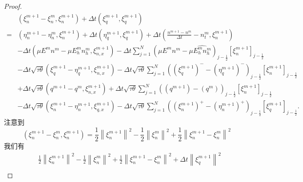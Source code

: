\begin{proof}
    $$
        \begin{aligned}
              & \left(\xi_{n}^{m+1}-\xi_{n}^{m}, \xi_{n}^{m+1}\right)+\Delta t\left(\xi_{q}^{m+1}, \xi_{q}^{m+1}\right)                                                                                                                                                                   \\
            = & \left(\eta_{n}^{m+1}-\eta_{n}^{m}, \xi_{n}^{m+1}\right)+\Delta t\left(\eta_{q}^{m+1}, \xi_{q}^{m+1}\right)+\Delta t\left(\frac{n^{m+1}-n^{m}}{\Delta t}-n_{t}^{m}, \xi_{n}^{m+1}\right)                                                                                   \\
              & -\Delta t\left(\mu E^{m} n^{m}-\mu E_{h}^{m} n_{h}^{m}, \xi_{n, x}^{m+1}\right)-\Delta t \sum_{j=1}^{N}\left(\mu E^{m} n^{m}-\mu \widehat{E_{h}^{m} n_{h}^{m}}\right)_{j-\frac{1}{2}}\left[\xi_{n}^{m+1}\right]_{j-\frac{1}{2}}                                           \\
              & -\Delta t \sqrt{\tau \theta}\left(\xi_{q}^{m+1}-\eta_{q}^{m+1}, \xi_{n, x}^{m+1}\right)-\Delta t \sqrt{\tau \theta} \sum_{j=1}^{N}\left(\left(\xi_{q}^{m+1}\right)^{-}-\left(\eta_{q}^{m+1}\right)^{-}\right)_{j-\frac{1}{2}}\left[\xi_{n}^{m+1}\right]_{j-\frac{1}{2}}   \\
              & +\Delta t \sqrt{\tau \theta}\left(q^{m+1}-q^{m}, \xi_{n, x}^{m+1}\right)+\Delta t \sqrt{\tau \theta} \sum_{j=1}^{N}\left(\left(q^{m+1}\right)-\left(q^{m}\right)\right)_{j-\frac{1}{2}}\left[\xi_{n}^{m+1}\right]_{j-\frac{1}{2}}                                         \\
              & -\Delta t \sqrt{\tau \theta}\left(\xi_{n}^{m+1}-\eta_{n}^{m+1}, \xi_{q, x}^{m+1}\right)-\Delta t \sqrt{\tau \theta} \sum_{j=1}^{N}\left(\left(\xi_{n}^{m+1}\right)^{+}-\left(\eta_{n}^{m+1}\right)^{+}\right)_{j-\frac{1}{2}}\left[\xi_{q}^{m+1}\right]_{j-\frac{1}{2}} .
        \end{aligned}
    $$
    注意到
    $$
        \left(\xi_{n}^{m+1}-\xi_{n}^{m}, \xi_{n}^{m+1}\right)=\frac{1}{2}\left\|\xi_{n}^{m+1}\right\|^{2}-\frac{1}{2}\left\|\xi_{n}^{m}\right\|^{2}+\frac{1}{2}\left\|\xi_{n}^{m+1}-\xi_{n}^{m}\right\|^{2}
    $$
    我们有
    $$
        \begin{aligned}
                 & \frac{1}{2}\left\|\xi_{n}^{m+1}\right\|^{2}-\frac{1}{2}\left\|\xi_{n}^{m}\right\|^{2}+\frac{1}{2}\left\|\xi_{n}^{m+1}-\xi_{n}^{m}\right\|^{2}+\Delta t\left\|\xi_{q}^{m+1}\right\|^{2}                                                                                                \\

\end{aligned}$$
\end{proof}
